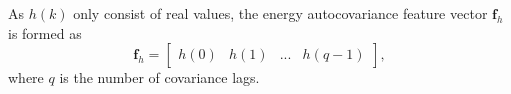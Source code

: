 As $h(k)$ only consist of real values, the energy autocovariance feature vector $\mathbf{f}_{h}$ is formed as
\begin{equation}
	\mathbf{f}_{h} = 
	\begin{bmatrix}
		h(0) & h(1) & ... & h(q-1)
	\end{bmatrix},
\end{equation}
where $q$ is the number of covariance lags. 






